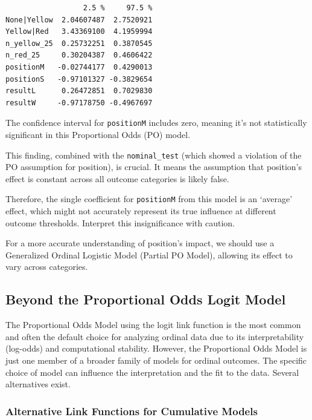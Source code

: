 \documentclass[
  letterpaper,
  DIV=11,
  numbers=noendperiod]{scrartcl}
\begin{document}
\begin{verbatim}
                  2.5 %     97.5 %
None|Yellow  2.04607487  2.7520921
Yellow|Red   3.43369100  4.1959994
n_yellow_25  0.25732251  0.3870545
n_red_25     0.30204387  0.4606422
positionM   -0.02744177  0.4290013
positionS   -0.97101327 -0.3829654
resultL      0.26472851  0.7029830
resultW     -0.97178750 -0.4967697
\end{verbatim}

The confidence interval for \texttt{positionM} includes zero, meaning
it's not statistically significant in this Proportional Odds (PO) model.

This finding, combined with the \texttt{nominal\_test} (which showed a
violation of the PO assumption for position), is crucial. It means the
assumption that position's effect is constant across all outcome
categories is likely false.

Therefore, the single coefficient for \texttt{positionM} from this model
is an `average' effect, which might not accurately represent its true
influence at different outcome thresholds. Interpret this insignificance
with caution.

For a more accurate understanding of position's impact, we should use a
Generalized Ordinal Logistic Model (Partial PO Model), allowing its
effect to vary across categories.

\hypertarget{beyond-the-proportional-odds-logit-model}{%
\subsection{Beyond the Proportional Odds Logit
Model}\label{beyond-the-proportional-odds-logit-model}}

The Proportional Odds Model using the logit link function is the most
common and often the default choice for analyzing ordinal data due to
its interpretability (log-odds) and computational stability. However,
the Proportional Odds Model is just one member of a broader family of
models for ordinal outcomes. The specific choice of model can influence
the interpretation and the fit to the data. Several alternatives exist.

\hypertarget{alternative-link-functions-for-cumulative-models}{%
\subsubsection{Alternative Link Functions for Cumulative
Models}\label{alternative-link-functions-for-cumulative-models}}
\end{document}

